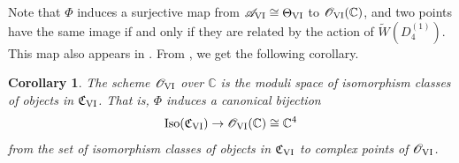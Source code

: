 \documentclass[a4paper,reqno]{amsart}
\numberwithin{equation}{section}
\newcommand{\C}{\mathbb{C}}
\newtheorem{corollary}[theorem]{Corollary}
\numberwithin{equation}{section}
\begin{document}
    Note that $\Phi$ induces a surjective map from $\mathscr{A}_{\rm{VI}}\cong \Theta_{\rm{VI}}$ to $\mathscr{O}_{\rm{VI}}(\C)$, and two points have the same image if and only if they are related by the action of $\widetilde{W}(D_4^{(1)})$. This map also appears in \cite[Rem. 11]{lisovyyalgebraic}.
    From , we get the following corollary.

\begin{corollary} \label{cor:modulispacePVI}
The scheme $\mathscr{O}_{\rm{VI}}$ over $\mathbb{C}$ is the moduli space of isomorphism classes of objects in $\mathfrak{C}_{\rm{VI}}$.
That is, $\Phi$ induces a canonical bijection
\begin{equation} \label{eq:canonicalbijectionPVI}
\operatorname{Iso}(\mathfrak{C}_{\rm{VI}}) \to \mathscr{O}_{\rm{VI}}(\mathbb{C})\cong \mathbb{C}^4
\end{equation}
from the set of isomorphism classes of objects in $\mathfrak{C}_{\rm{VI}}$ to complex points of $\mathscr{O}_{\rm{VI}}$.
\end{corollary}
\end{document}

